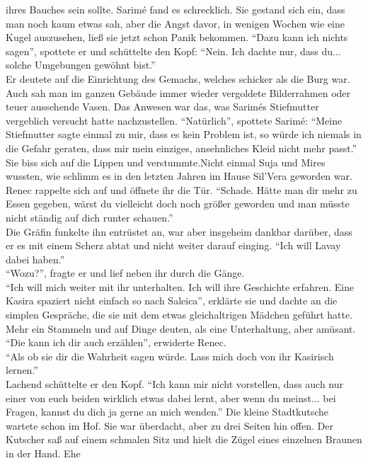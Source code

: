 ihres Bauches sein sollte. Sarimé fand es schrecklich. Sie gestand sich ein, dass man noch kaum 
etwas sah, aber die Angst davor, in wenigen Wochen wie eine Kugel auszusehen, ließ sie jetzt schon 
Panik bekommen. 
``Dazu kann ich nichts sagen'', spottete er und schüttelte den Kopf: ``Nein. Ich dachte nur, dass 
du... solche Umgebungen gewöhnt bist.''\\
Er deutete auf die Einrichtung des Gemachs, welches schicker als die Burg war. Auch sah man im 
ganzen Gebäude immer wieder vergoldete Bilderrahmen oder teuer aussehende Vasen. Das Anwesen war 
das, was Sarimés Stiefmutter vergeblich versucht hatte nachzustellen. ``Natürlich'', spottete 
Sarimé: ``Meine Stiefmutter sagte einmal zu mir, dass es kein Problem ist, so würde ich niemals in 
die Gefahr geraten, dass mir mein einziges, ansehnliches Kleid nicht mehr passt.''\\
Sie biss sich auf die Lippen und verstummte.Nicht einmal Suja und Mires wussten, wie schlimm es in 
den letzten Jahren im Hause Sil'Vera geworden war.\\
Renec rappelte sich auf und öffnete ihr die Tür. ``Schade. Hätte man dir mehr zu Essen gegeben, 
wärst du vielleicht doch noch größer geworden und man müsste nicht ständig auf dich runter 
schauen.''\\
Die Gräfin funkelte ihn entrüstet an, war aber insgeheim dankbar darüber, dass er es mit einem 
Scherz abtat und nicht weiter darauf einging. ``Ich will Lavay dabei haben.''\\
``Wozu?'', fragte er und lief neben ihr durch die Gänge.\\
``Ich will mich weiter mit ihr unterhalten. Ich will ihre Geschichte erfahren. Eine Kasira spaziert 
nicht einfach so nach Saleica'', erklärte sie und dachte an die simplen Gespräche, die sie mit dem 
etwas gleichaltrigen Mädchen geführt hatte. Mehr ein Stammeln und auf Dinge deuten, als eine 
Unterhaltung, aber amüsant.\\
``Die kann ich dir auch erzählen'', erwiderte Renec.\\
``Als ob sie dir die Wahrheit sagen würde. Lass mich doch von ihr Kasirisch lernen.''\\
Lachend schüttelte er den Kopf. ``Ich kann mir nicht vorstellen, dass auch nur einer von euch 
beiden wirklich etwas dabei lernt, aber wenn du meinst... bei Fragen, kannst du dich ja gerne an 
mich wenden.''
Die kleine Stadtkutsche wartete schon im Hof. Sie war überdacht, aber zu drei Seiten hin offen. Der 
Kutscher saß auf einem schmalen Sitz und hielt die Zügel eines einzelnen Braunen in der Hand. Ehe 
